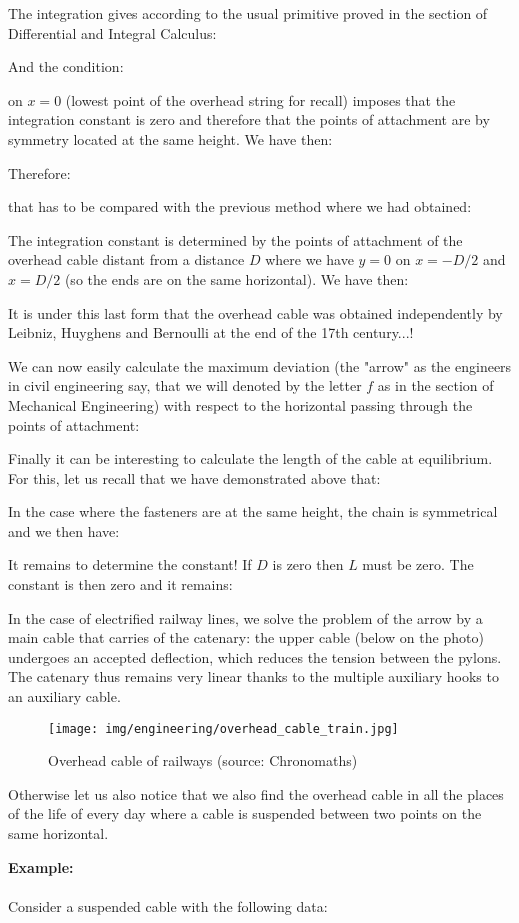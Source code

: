 \begin{itemize}
		The integration gives according to the usual primitive proved in the section of Differential and Integral Calculus:
		
		And the condition:
		
		on $x=0$ (lowest point of the overhead string for recall) imposes that the integration constant is zero and therefore that the points of attachment are by symmetry located at the same height. We have then:
		
		Therefore:
		
		that has to be compared with the previous method where we had obtained:
		
		The integration constant is determined by the points of attachment of the overhead cable distant from a distance $D$ where we have $y=0$ on $x=-D/2$ and $x=D/2$ (so the ends are on the same horizontal). We have then:
		
		It is under this last form that the overhead cable was obtained independently by Leibniz, Huyghens and Bernoulli at the end of the 17th century...!
	
		We can now easily calculate the maximum deviation (the "arrow" as the engineers in civil engineering say, that we will denoted by the letter $f$ as in the section of Mechanical Engineering) with respect to the horizontal passing through the points of attachment:
		
		Finally it can be interesting to calculate the length of the cable at equilibrium. For this, let us recall that we have demonstrated above that:
		
		In the case where the fasteners are at the same height, the chain is symmetrical and we then have:
		
		It remains to determine the constant! If $D$ is zero then $L$ must be zero. The constant is then zero and it remains:
		
		In the case of electrified railway lines, we solve the problem of the arrow by a main cable that carries of the catenary: the upper cable (below on the photo) undergoes an accepted deflection, which reduces the tension between the pylons. The catenary thus remains very linear thanks to the multiple auxiliary hooks to an auxiliary cable.
		\begin{figure}[H]
			\centering
			\texttt{[image: img/engineering/overhead\_cable\_train.jpg]}
			\caption[Overhead cable of railways ]{Overhead cable of railways (source: Chronomaths)}
		\end{figure}
		Otherwise let us also notice that we also find the overhead cable in all the places of the life of every day where a cable is suspended between two points on the same horizontal.
		\begin{tcolorbox}[colframe=black,colback=white,sharp corners]
		\textbf{{\Large {}}Example:}\\\\
		Consider a suspended cable with the following data:
		

\end{tcolorbox}
\end{itemize}
